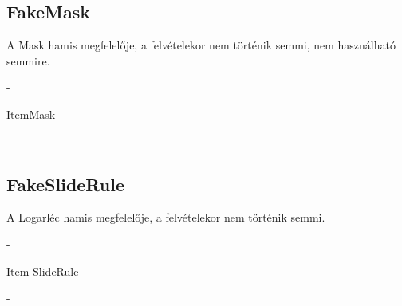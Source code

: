 \subsection{FakeMask}
\begin{class-template-responsibility}
    A Mask hamis megfelelője, a felvételekor nem történik semmi, nem használható semmire.
\end{class-template-responsibility}
\begin{class-template-interface}
    -
\end{class-template-interface}
\begin{class-template-baseclass}
    Item\baseclass Mask
\end{class-template-baseclass}
\begin{class-template-attribute}
    -
\end{class-template-attribute}
\begin{class-template-method}
\end{class-template-method}

\subsection{FakeSlideRule}
\begin{class-template-responsibility}
    A Logarléc hamis megfelelője, a felvételekor nem történik semmi.
\end{class-template-responsibility}
\begin{class-template-interface}
    -
\end{class-template-interface}
\begin{class-template-baseclass}
    Item \baseclass SlideRule
\end{class-template-baseclass}
\begin{class-template-attribute}
    -
\end{class-template-attribute}
\begin{class-template-method}
\end{class-template-method}

